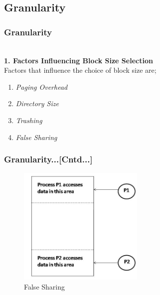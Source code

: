 \documentclass{beamer}
\begin{document}
\subsection{Granularity}
\begin{frame}
	\frametitle{Granularity}
	\\
	\vspace{0.5cm}
	\textbf{1. Factors Influencing Block Size Selection}\\
	\vspace{0.5cm}
	Factors that influence the choice of block size are;
	\vspace{0.25cm}
	\begin{enumerate}
		\item \textit{Paging Overhead}
		\item \textit{Directory Size}
		\item \textit{Trashing}
		\item \textit{False Sharing}
	\end{enumerate}
	\vspace{2cm}
\end{frame}


\begin{frame}
	\frametitle{Granularity...[Cntd...]}
	\begin{figure}
	 	\centering
	 	\includegraphics[width=6cm]{fig52.jpg}
	 	\caption{False Sharing}\label{fig52}
	 \end{figure}

\end{frame}
\end{document}
